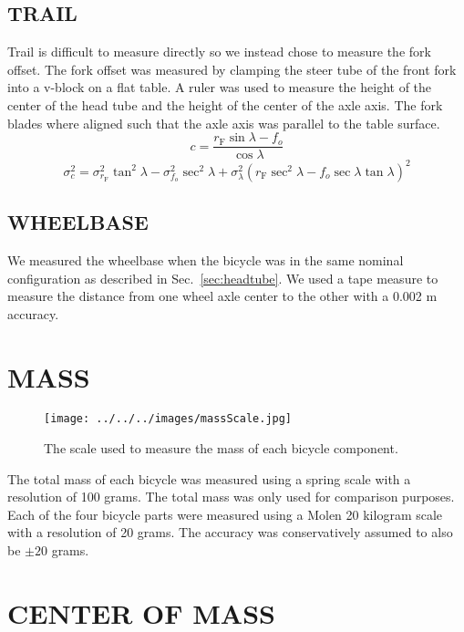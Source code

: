 \documentclass{bmd2010p}
\begin{document}
\subsection{TRAIL}
Trail is difficult to measure directly so we instead chose to measure the fork
offset. The fork offset was measured by clamping the steer tube of the front
fork into a v-block on a flat table. A ruler was used to measure the height of
the center of the head tube and the height of the center of the axle axis. The
fork blades where aligned such that the axle axis was parallel to the table
surface.
\begin{equation}
	c=\frac{r_\mathrm{F}\sin{\lambda}-f_o}{\cos{\lambda}}
	\label{eq:trail}
\end{equation}
\begin{equation}
    \sigma_{c}^{2}=\sigma_{r_{\mathrm{F}}}^{2}\tan^2{\lambda} -
    \sigma_{f_o}^{2}\sec^2{\lambda} +
    \sigma_{\lambda}^{2}\left(r_\mathrm{F}\sec^2{\lambda} -
    f_o\sec{\lambda}\tan{\lambda}\right)^2
    \label{eq:TrailVar}
\end{equation}
\subsection{WHEELBASE}
We measured the wheelbase when the bicycle was in the same nominal
configuration as described in Sec.~\ref{sec:headtube}. We used a tape measure
to measure the distance from one wheel axle center to the other with a 0.002 m
accuracy.
\section{MASS}
\begin{figure}[tbp]
    \begin{center}
        \texttt{[image: ../../../images/massScale.jpg]}
    \end{center}
    \caption{The scale used to measure the mass of each bicycle component.}
    \label{fig:massScale}
\end{figure}
The total mass of each bicycle was measured using a spring scale with a
resolution of 100 grams. The total mass was only used for comparison purposes.
Each of the four bicycle parts were measured using a Molen 20 kilogram scale with a
resolution of 20 grams. The accuracy was conservatively assumed to also be
$\pm20$ grams.
\section{CENTER OF MASS}
\end{document}
